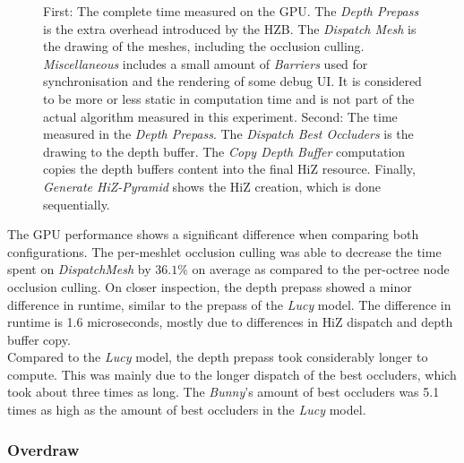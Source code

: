\begin{figure}[!htb]
  \caption{First: The complete time measured on the \ac{GPU}. The \emph{Depth Prepass} is the extra overhead 
  introduced by the \ac{HZB}. The \emph{Dispatch Mesh} is the drawing of the meshes, including the occlusion 
  culling. \emph{Miscellaneous} includes a small amount of \emph{Barriers} used for synchronisation and the 
  rendering of some debug \ac{UI}. It is considered to be more or less static in computation time and is not 
  part of the actual algorithm measured in this experiment. Second: The time measured in the \emph{Depth Prepass}. 
  The \emph{Dispatch Best Occluders} is the drawing to the depth buffer. The \emph{Copy Depth Buffer} computation 
  copies the depth buffers content into the final \ac{HiZ} resource. Finally, \emph{Generate HiZ-Pyramid} 
  shows the \ac{HiZ} creation, which is done sequentially.}
\end{figure}

\noindent
The \ac{GPU} performance shows a significant difference when comparing both configurations. The per-meshlet 
occlusion culling was able to decrease the time spent on \emph{DispatchMesh} by $36.1\%$ on average as compared 
to the per-octree node occlusion culling. On closer inspection, the depth prepass showed a minor difference 
in runtime, similar to the prepass of the \emph{Lucy} model. The difference in runtime is 1.6 microseconds, 
mostly due to differences in \ac{HiZ} dispatch and depth buffer copy. \\

\noindent
Compared to the \emph{Lucy} model, the depth prepass took considerably longer to compute. This was mainly due to 
the longer dispatch of the best occluders, which took about three times as long. The \emph{Bunny}'s amount of 
best occluders was 5.1 times as high as the amount of best occluders in the \emph{Lucy} model.

\subsubsection*{Overdraw} \label{subsubsec-overdraw-bunny}

